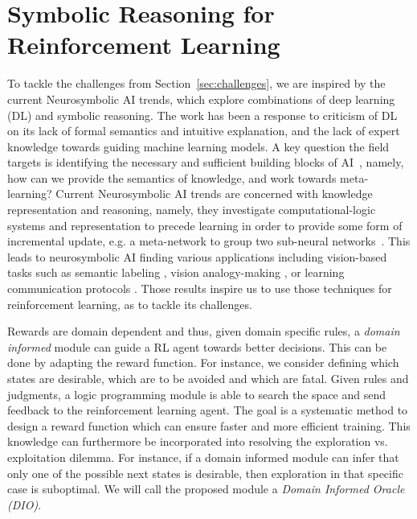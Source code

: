 \section{Symbolic Reasoning for Reinforcement Learning} 
\label{symrl}

To tackle the challenges from Section~\ref{sec:challenges}, we are
inspired by the current Neurosymbolic AI trends, which explore
combinations of deep learning (DL) and symbolic reasoning.
%
The work has been a response to criticism of DL on its lack of formal
semantics and intuitive explanation, and the lack of expert knowledge
towards guiding machine learning models.
%
A key question the field targets is identifying the necessary and
sufficient building blocks of AI~\cite{garcez2020neurosymbolic},
namely, how can we provide the semantics of knowledge, and work
towards meta-learning? 
%
Current Neurosymbolic AI trends are concerned with knowledge representation and reasoning, namely, they investigate computational-logic systems 
and representation to precede learning in order to provide some form
of incremental update, e.g. a meta-network to group two sub-neural
networks~\cite{Besold2017NeuralSymbolicLA}.
This leads to neurosymbolic AI finding various applications including vision-based tasks such as semantic labeling \cite{vinyals2015, karpathy2015}, 
vision analogy-making \cite{Reed2015DeepVA}, or learning communication
protocols \cite{Foerster2016LearningTC}.
Those results inspire us to use those techniques for reinforcement learning, as to tackle its challenges.

\medskip
Rewards are domain dependent and thus, given domain specific rules, a \emph{domain informed} module can guide a RL agent towards better decisions. This can be done by 
adapting the reward function. For instance, we consider defining which states are desirable, which are to be avoided and which are fatal. Given rules and judgments, a logic programming module 
is able to search the space and send feedback to the reinforcement learning agent. The goal is a systematic method to design a reward function which can ensure faster and more efficient 
training. This knowledge can furthermore be incorporated into resolving the exploration vs. exploitation dilemma. For instance, if a domain informed module 
can infer that only one of the possible next states is desirable, then exploration in that specific case is suboptimal.  
We will call the proposed module a \emph{Domain Informed Oracle
(DIO)}. 

